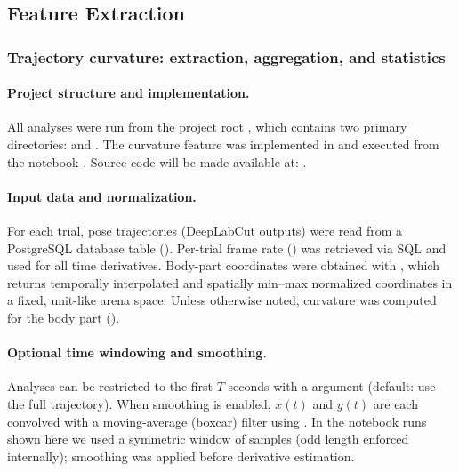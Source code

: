\subsection*{Feature Extraction}
\subsubsection{Trajectory curvature: extraction, aggregation, and statistics}

\paragraph{Project structure and implementation.}
All analyses were run from the project root , which contains two primary directories:  and . The curvature feature was implemented in \href{https://github.com/atanugiri/GhrelinBehaviorQuantification/blob/main/Python_scripts/Feature_functions/trajectory_curvature.py}{} and executed from the notebook \href{https://github.com/atanugiri/GhrelinBehaviorQuantification/blob/main/DLC-Jupyter-Notebooks/37_data_analysis_curvature.ipynb}{}. Source code will be made available at: \href{https://github.com/atanugiri/GhrelinBehaviorQuantification}{}.

\paragraph{Input data and normalization.}
For each trial, pose trajectories (DeepLabCut outputs) were read from a PostgreSQL database table (). Per-trial frame rate () was retrieved via SQL and used for all time derivatives. Body-part coordinates were obtained with \href{https://github.com/atanugiri/GhrelinBehaviorQuantification/blob/main/Python_scripts/Data_analysis/normalized_bodypart.py}{}, which returns temporally interpolated and spatially min–max normalized coordinates in a fixed, unit-like arena space. Unless otherwise noted, curvature was computed for the  body part ().

\paragraph{Optional time windowing and smoothing.}
Analyses can be restricted to the first $T$ seconds with a  argument (default: use the full trajectory). When smoothing is enabled, $x(t)$ and $y(t)$ are each convolved with a moving-average (boxcar) filter using . In the notebook runs shown here we used a symmetric window of  samples (odd length enforced internally); smoothing was applied before derivative estimation.

